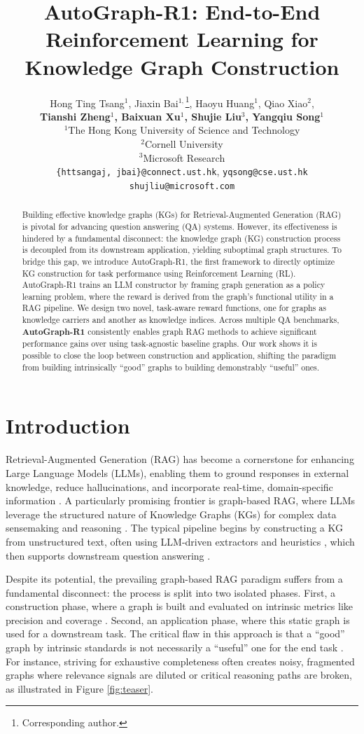 \documentclass[11pt]{article}
\title{AutoGraph-R1: End-to-End Reinforcement Learning for Knowledge Graph Construction}
\author{Hong Ting Tsang$^1$, Jiaxin Bai$^{1,}$\thanks{Corresponding author.}, Haoyu Huang$^1$, Qiao Xiao$^2$, 
\\ \textbf{Tianshi Zheng$^1$, Baixuan Xu$^1$, Shujie Liu$^3$, Yangqiu Song$^{1}$}\\
  $^1$The Hong Kong University of Science and Technology\\
    $^2$Cornell University\\
    $^3$Microsoft Research\\
  \texttt{\{httsangaj, jbai\}@connect.ust.hk}, \texttt{yqsong@cse.ust.hk} \\
\texttt{shujliu@microsoft.com} 
}
\begin{document}
\maketitle
\begin{abstract}
Building effective knowledge graphs (KGs) for Retrieval-Augmented Generation (RAG) is pivotal for advancing question answering (QA) systems. However, its effectiveness is hindered by a fundamental disconnect: the knowledge graph (KG) construction process is decoupled from its downstream application, yielding suboptimal graph structures. To bridge this gap, we introduce AutoGraph-R1, the first framework to directly optimize KG construction for task performance using Reinforcement Learning (RL). AutoGraph-R1 trains an LLM constructor by framing graph generation as a policy learning problem, where the reward is derived from the graph's functional utility in a RAG pipeline. We design two novel, task-aware reward functions, one for graphs as knowledge carriers and another as knowledge indices. Across multiple QA benchmarks, \textbf{AutoGraph-R1} consistently enables graph RAG methods to achieve significant performance gains over using task-agnostic baseline graphs. Our work shows it is possible to close the loop between construction and application, shifting the paradigm from building intrinsically ``good'' graphs to building demonstrably ``useful'' ones.
\end{abstract}

\section{Introduction}

Retrieval-Augmented Generation (RAG) has become a cornerstone for enhancing Large Language Models (LLMs), enabling them to ground responses in external knowledge, reduce hallucinations, and incorporate real-time, domain-specific information \citep{gao2024retrievalaugmentedgenerationlargelanguage, peng2024graphretrievalaugmentedgenerationsurvey}. A particularly promising frontier is graph-based RAG, where LLMs leverage the structured nature of Knowledge Graphs (KGs) for complex data sensemaking and reasoning \citep{edge_local_2025}. The typical pipeline begins by constructing a KG from unstructured text, often using LLM-driven extractors and heuristics \citep{han_pive_2024, lairgi_itext2kg_2024, bai_autoschemakg_2025}, which then supports downstream question answering \citep{gutierrez_hipporag_2025, sun_think--graph_2024}.

Despite its potential, the prevailing graph-based RAG paradigm suffers from a fundamental disconnect: the process is split into two isolated phases. First, a construction phase, where a graph is built and evaluated on intrinsic metrics like precision and coverage \citep{huang_can_2025}. Second, an application phase, where this static graph is used for a downstream task. The critical flaw in this approach is that a ``good'' graph by intrinsic standards is not necessarily a ``useful'' one for the end task \citep{xue_knowledge_2022}. For instance, striving for exhaustive completeness often creates noisy, fragmented graphs where relevance signals are diluted or critical reasoning paths are broken, as illustrated in Figure \ref{fig:teaser}.
\end{document}
